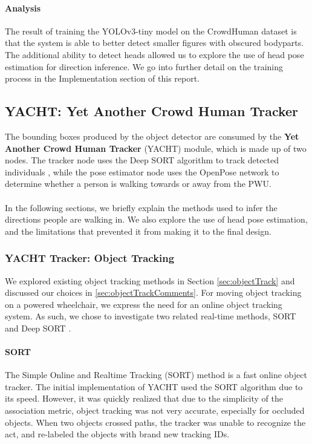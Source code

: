 \paragraph{Analysis}
The result of training the YOLOv3-tiny model on the CrowdHuman dataset is that the system is able to better detect smaller figures with obscured bodyparts. The additional ability to detect heads allowed us to explore the use of head pose estimation for direction inference. We go into further detail on the training process in the Implementation section of this report.

\subsection{YACHT: Yet Another Crowd Human Tracker}
The bounding boxes produced by the object detector are consumed by the \textbf{Yet Another Crowd Human Tracker} (YACHT) module, which is made up of two nodes. The tracker node uses the Deep SORT algorithm to track detected individuals \cite{Wojke2018}, while the pose estimator node uses the OpenPose \cite{Cao2017} network to determine whether a person is walking towards or away from the PWU.

\paragraph{}In the following sections, we briefly explain the  methods used to infer the directions people are walking in. We also explore the use of head pose estimation, and the limitations that prevented it from making it to the final design.

\subsubsection{YACHT Tracker: Object Tracking} \label{sec:YACHT}
We explored existing object tracking methods in Section \ref{sec:objectTrack} and discussed our choices in \ref{sec:objectTrackComments}. For moving object tracking on a powered wheelchair, we express the need for an online object tracking system. As such, we chose to investigate two related real-time methods, SORT \cite{Bewley2016} and Deep SORT \cite{Wojke2018}.

\paragraph{SORT}  The Simple Online and Realtime Tracking (SORT) method is a fast online object tracker. The initial implementation of YACHT used the SORT algorithm due to its speed. However, it was quickly realized that due to the simplicity of the association metric, object tracking was not very accurate, especially for occluded objects. When two objects crossed paths, the tracker was unable to recognize the act, and re-labeled the objects with brand new tracking IDs.

